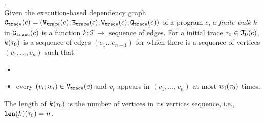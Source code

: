   \begin{defn}.
  \label{def:finitewalk}
  \\
  Given the execution-based dependency graph $\mathtt{{G_{trace}}}({c}) = (\mathtt{{V_{trace}}}({c}), \mathtt{{E_{trace}}}({c}), \mathtt{{W_{trace}}}({c}), \mathtt{{Q_{trace}}}({c}))$ of a program $c$,
  a \emph{finite walk} $k$ in $\mathtt{{G_{trace}}}({c})$ is a 
  function $k: \mathcal{T} \to $ sequence of edges.
  For a initial trace $\mathtt{\tau}_0 \in \mathcal{T}_0(c)$, 
  $k(\mathtt{\tau}_0)$ is a sequence of edges $(e_1 \ldots e_{n - 1})$ 
  for which there is a sequence of vertices 
  $(v_1, \ldots, v_{n})$ such that:
  \begin{itemize}
      \item {}
      \item every $(v_i, w_i) \in \mathtt{{V_{trace}}}(c)$
       and $v_i$ appears in $(v_1, \ldots, v_{n})$ at most 
    $w_i(\mathtt{\tau}_0)$
      times.  
  \end{itemize}
  The length of $k(\mathtt{\tau}_0)$ is the number of vertices in its vertices sequence, i.e., $\mathtt{len}(k)(\mathtt{\tau}_0) = n$.
 \end{defn}

